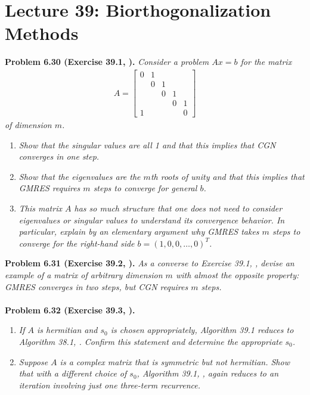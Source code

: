 \documentclass[a4paper,oneside]{book}
\numberwithin{equation}{chapter}
\begin{document}
\section{Lecture 39: Biorthogonalization Methods}
\textbf{Problem 6.30 (Exercise 39.1, \cite{1}).} \textit{Consider a problem $Ax=b$ for the matrix }
\begin{align}
A = \left[ {\begin{array}{*{20}{c}}
0&1&{}&{}&{}\\
{}&0&1&{}&{}\\
{}&{}&0&1&{}\\
{}&{}&{}&0&1\\
1&{}&{}&{}&0
\end{array}} \right]
\end{align}
\textit{of dimension $m$.}
\begin{enumerate}
\item \textit{Show that the singular values are all 1 and that this implies that CGN converges in one step.}
\item \textit{Show that the eigenvalues are the $m$th roots of unity and that this implies that GMRES requires $m$ steps to converge for general $b$.}
\item \textit{This matrix $A$ has so much structure that one does not need to consider eigenvalues or singular values to understand its convergence behavior. In particular, explain by an elementary argument why GMRES takes $m$ steps to converge for the right-hand side $b=\left(1,0,0,\ldots,0\right)^T$.}
\end{enumerate}
\textbf{Problem 6.31 (Exercise 39.2, \cite{1}).} \textit{As a converse to Exercise 39.1, \cite{1}, devise an example of a matrix of arbitrary dimension $m$ with almost the opposite property: GMRES converges in two steps, but CGN requires $m$ steps.}\\
\\
\textbf{Problem 6.32 (Exercise 39.3, \cite{1}).} 
\begin{enumerate}
\item \textit{If $A$ is hermitian and $s_0$ is chosen appropriately, Algorithm 39.1 reduces to Algorithm 38.1, \cite{1}. Confirm this statement and determine the appropriate $s_0$.}
\item \textit{Suppose $A$ is a complex matrix that is symmetric but not hermitian. Show that with a different choice of $s_0$, Algorithm 39.1,  \cite{1}, again reduces to an iteration involving just one three-term recurrence.}
\end{enumerate}
\end{document}
